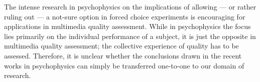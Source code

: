 \documentclass[a4paper,conference]{IEEEtran}
\begin{document}
The intense research in psychophysics on the implications of allowing --- or rather ruling out --- a not-sure option in forced choice experiments is encouraging for applications in multimedia quality assessment. 
%
While in psychophysics the focus lies primarily on the individual performance of a subject, it is just the opposite in multimedia quality assessment; the collective experience of quality has to be assessed. 
%
Therefore, it is unclear whether the conclusions drawn in the recent works in psychophysics can simply be transferred one-to-one to our domain of research. 




\end{document}
